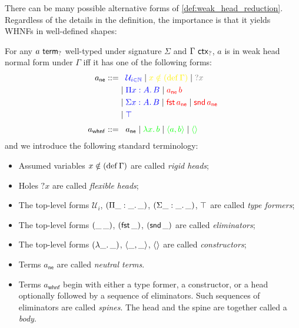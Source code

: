 \documentclass[twoside]{report}
\begin{document}
There can be many possible alternative forms of \cref{def:weak_head_reduction}. Regardless of the details in the definition, the importance is that it yields WHNFs in well-defined shapes:

\begin{proposition}
    \label{thm:weak_head_normal_form}
    For any $a \ \mathsf{term}_{?}$ well-typed under signature $\Sigma$ and $\Gamma \ \mathsf{ctx}_{?}$, $a$ is in weak head normal form under $\Gamma$ iff it has one of the following forms:
    $$
        \begin{aligned}
            a_\mathsf{ne} ::=
             & \phantom{{}\mid{}} \textcolor{blue}{\mathcal U_{i \in \mathbb N}} \mid \textcolor{yellow}{x \notin (\defn \Gamma)} \mid \textcolor{gray}{?x} \\
             & \mid \textcolor{blue}{\ppi x A B} \mid \textcolor{red}{\app {a_\mathsf{ne}} b}                                                               \\
             & \mid \textcolor{blue}{\sig x A B} \mid \textcolor{red}{\fst {a_\mathsf{ne}}} \mid \textcolor{red}{\snd {a_\mathsf{ne}}}                      \\
             & \mid \textcolor{blue}{\unit}                                                                                                                 \\[0.3em]
            a_\mathsf{whnf} ::=
             & \phantom{{}\mid{}} a_\mathsf{ne} \mid \textcolor{green}{\lam x b} \mid \textcolor{green}{\pair a b} \mid \textcolor{green}{\sstar}           \\
        \end{aligned}
    $$
    and we introduce the following standard terminology:
    \begin{itemize}[noitemsep]
        \item Assumed variables $x \notin (\operatorname{def} \Gamma)$ are called \emph{rigid heads};
        \item Holes $?x$ are called \emph{flexible heads};
        \item The top-level forms $\mathcal U_i$, $(\Pi{\_} : {\_}.\,{\_})$, $(\Sigma{\_} : {\_}.\,{\_})$, $\top$ are called \emph{type formers};
        \item The top-level forms $({\_}\,{\_})$, $(\operatorname{\mathsf{fst}} \_)$, $(\operatorname{\mathsf{snd}} \_)$ are called \emph{eliminators};
        \item The top-level forms $(\lambda{\_}.\,{\_})$, $\langle{\_}, {\_}\rangle$, $\langle\rangle$ are called \emph{constructors};
        \item Terms $a_\mathsf{ne}$ are called \emph{neutral terms}.
        \item Terms $a_\mathsf{whnf}$ begin with either a type former, a constructor, or a head optionally followed by a sequence of eliminators. Such sequences of eliminators are called \emph{spines}. The head and the spine are together called a \emph{body}.
    \end{itemize}
\end{proposition}
\end{document}
